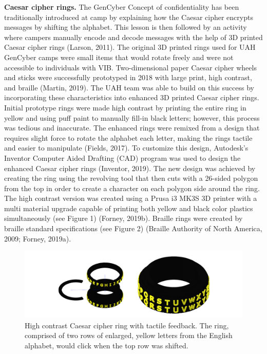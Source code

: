 \documentclass[11.5pt]{sig-alternate} %
\begin{document}
\begin{large}
\textbf{Caesar cipher rings.} The GenCyber Concept of confidentiality has been traditionally introduced at camp by explaining how the Caesar cipher encrypts messages by shifting the alphabet. This lesson is then followed by an activity where campers manually encode and decode messages with the help of 3D printed Caesar cipher rings (Larson, 2011). The original 3D printed rings used for UAH GenCyber camps were small items that would rotate freely and were not accessible to individuals with VIB. Two-dimensional paper Caesar cipher wheels and sticks were successfully prototyped in 2018 with large print, high contrast, and braille (Martin, 2019). The UAH team was able to build on this success by incorporating these characteristics into enhanced 3D printed Caesar cipher rings. Initial prototype rings were made high contrast by printing the entire ring in yellow and using puff paint to manually fill-in black letters; however, this process was tedious and inaccurate. The enhanced rings were remixed from a design that requires slight force to rotate the alphabet each letter, making the rings tactile and easier to manipulate (Fields, 2017). To customize this design, Autodesk’s Inventor Computer Aided Drafting (CAD) program was used to design the enhanced Caesar cipher rings (Inventor, 2019). The new design was achieved by creating the ring using the revolving tool that then cuts with a 26-sided polygon from the top in order to create a character on each polygon side around the ring. The high contrast version was created using a Prusa i3 MK3S 3D printer with a multi material upgrade capable of printing both yellow and black color plastics simultaneously (see Figure 1) (Forney, 2019b). Braille rings were created by braille standard specifications (see Figure 2) (Braille Authority of North America, 2009; Forney, 2019a).

\begin{figure}[ht]
    \centering
    \includegraphics[width=1\linewidth]{1117_Fig1.png}
    \caption{High contrast Caesar cipher ring with tactile feedback. The ring, comprised of two rows of enlarged, yellow letters from the English alphabet, would click when the top row was shifted.}
\end{figure}


\end{large}
\end{document}
